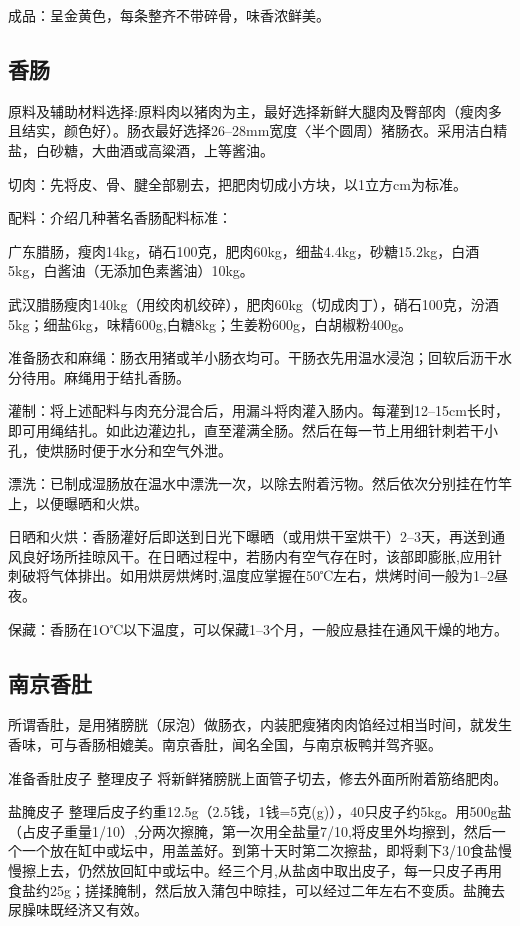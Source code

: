 \documentclass{ctexbook}
\begin{document}
成品：呈金黄色，每条整齐不带碎骨，味香浓鲜美。

\subsection{香肠}
原料及辅助材料选择:原料肉以猪肉为主，最好选择新鲜大腿肉及臀部肉（瘦肉多且结实，颜色好）。肠衣最好选择26--28mm宽度〈半个圆周）猪肠衣。采用洁白精盐，白砂糖，大曲酒或高粱酒，上等酱油。

切肉：先将皮、骨、腱全部剔去，把肥肉切成小方块，以1立方cm为标准。

配料：介绍几种著名香肠配料标准：

广东腊肠，瘦肉14kg，硝石100克，肥肉60kg，细盐4.4kg，砂糖15.2kg，白酒5kg，白酱油（无添加色素酱油）10kg。

武汉腊肠瘦肉140kg（用绞肉机绞碎），肥肉60kg（切成肉丁），硝石100克，汾酒5kg；细盐6kg，味精600g,白糖8kg；生姜粉600g，白胡椒粉400g。

准备肠衣和麻绳：肠衣用猪或羊小肠衣均可。干肠衣先用温水浸泡；回软后沥干水分待用。麻绳用于结扎香肠。

灌制：将上述配料与肉充分混合后，用漏斗将肉灌入肠内。每灌到12--15cm长时，即可用绳结扎。如此边灌边扎，直至灌满全肠。然后在每一节上用细针刺若干小孔，使烘肠时便于水分和空气外泄。

漂洗：已制成湿肠放在温水中漂洗一次，以除去附着污物。然后依次分别挂在竹竿上，以便曝晒和火烘。

日晒和火烘：香肠灌好后即送到日光下曝晒（或用烘干室烘干）2--3天，再送到通风良好场所挂晾风干。在日晒过程中，若肠内有空气存在时，该部即膨胀,应用针刺破将气体排出。如用烘房烘烤时,温度应掌握在50℃左右，烘烤时间一般为1--2昼夜。

保藏：香肠在1O℃以下温度，可以保藏1--3个月，一般应悬挂在通风干燥的地方。
\subsection{南京香肚}
所谓香肚，是用猪膀胱（尿泡）做肠衣，内装肥瘦猪肉肉馅经过相当时间，就发生香味，可与香肠相媲美。南京香肚，闻名全国，与南京板鸭并驾齐驱。

准备香肚皮子
整理皮子 将新鲜猪膀胱上面管子切去，修去外面所附着筋络肥肉。

盐腌皮子 整理后皮子约重12.5g（2.5钱，1钱=5克(g)），40只皮子约5kg。用500g盐（占皮子重量1/10）,分两次擦腌，第一次用全盐量7/10,将皮里外均擦到，然后一个一个放在缸中或坛中，用盖盖好。到第十天时第二次擦盐，即将剩下3/10食盐慢慢擦上去，仍然放回缸中或坛中。经三个月,从盐卤中取出皮子，每一只皮子再用食盐约25g；搓揉腌制，然后放入蒲包中晾挂，可以经过二年左右不变质。盐腌去尿臊味既经济又有效。
\end{document}
